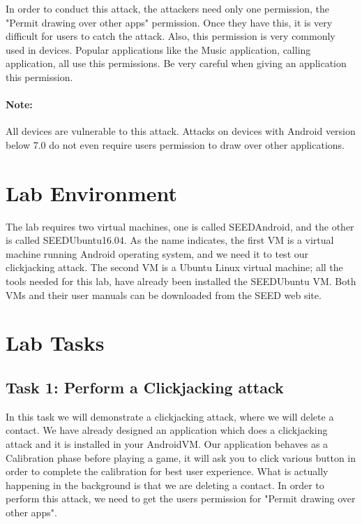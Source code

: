 In order to conduct this attack, the attackers need only one permission, the "Permit drawing over other apps" permission.
Once they have this, it is very difficult for users to catch the attack. Also, this permission is very commonly used in devices. 
Popular applications like the Music application, calling application, all use this permissions. Be very careful when giving an 
application this permission.

\paragraph{Note:} All devices are vulnerable to this attack. Attacks on devices with Android version below 7.0 do not even require users permission to draw over other applications. 



\section{Lab Environment}

The lab requires two virtual machines, one is called SEEDAndroid, and the other is called
SEEDUbuntu16.04. As the name indicates, the first VM is a virtual machine running Android
operating system, and we need it to test our clickjacking attack. The second
VM is a Ubuntu Linux virtual machine; all the tools needed for
this lab, have already been installed the SEEDUbuntu VM. 
Both VMs and their user manuals can be downloaded from the SEED web site. 



\section{Lab Tasks}



\subsection{Task 1: Perform a Clickjacking attack}


In this task we will demonstrate a clickjacking attack, where we will delete a contact. We have already designed an
application which does a clickjacking attack and it is installed in your AndroidVM.
Our application behaves as a Calibration phase before playing a game, it will ask you to click various button in order to complete the 
calibration for best user experience. What is actually happening in the background is that we are deleting a contact. In order to perform
this attack, we need to get the users permission for "Permit drawing over other apps". 

